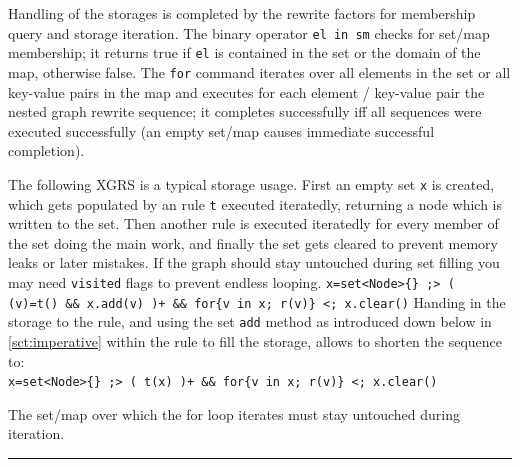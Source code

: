 \noindent Handling of the storages is completed by the rewrite factors for membership query and storage iteration.
The binary operator \texttt{el in sm} checks for set/map membership; it returns true if \texttt{el} is contained in the set or the domain of the map, otherwise false.
The \texttt{for} command iterates over all elements in the set or all key-value pairs in the map and executes for each element / key-value pair the nested graph rewrite sequence; it completes successfully iff all sequences were executed successfully (an empty set/map causes immediate successful completion).

\begin{example}
The following XGRS is a typical storage usage.
First an empty set \texttt{x} is created, which gets populated by an rule \texttt{t} executed iteratedly, returning a node which is written to the set.
Then another rule is executed iteratedly for every member of the set doing the main work, and finally the set gets cleared to prevent memory leaks or later mistakes.
If the graph should stay untouched during set filling you may need \texttt{visited} flags to prevent endless looping.
\verb#x=set<Node>{} ;> ( (v)=t() && x.add(v) )+ && for{v in x; r(v)} <; x.clear()#
Handing in the storage to the rule, and using the set \texttt{add} method as introduced down below in \ref{sct:imperative} within the rule to fill the storage, allows to shorten the sequence to:\\
\verb#x=set<Node>{} ;> ( t(x) )+ && for{v in x; r(v)} <; x.clear()#
\end{example}

\begin{note}
The set/map over which the for loop iterates must stay untouched during iteration.
\end{note}

\vspace{5mm}
\hrule
\vspace{5mm}

